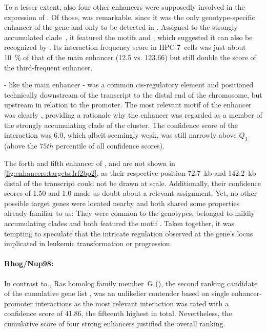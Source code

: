  To a lesser extent, also four other enhancers were supposedly involved in the expression of . Of those,  was remarkable, since it was the only genotype-specific enhancer of the gene and only to be detected in \dnmtwt{}. Assigned to the strongly accumulated clade~, it featured the motifs \motifmlltwo and \motifmlltwoc, which suggested it can also be recognized by . Its interaction frequency score in HPC-7~cells was just about \SI{10}{\percent} of that of the main enhancer (\num{12.5} vs. \num{123.66}) but still double the score of the third-frequent enhancer.    
 
  - like the main enhancer - was a common cis-regulatory element and positioned technically downstream of the transcript to the distal end of the chromosome, but upstream in relation to the promoter. The most relevant motif of the enhancer was clearly \motifpuone{}, providing a rationale why the enhancer was regarded as a member of the strongly accumulating clade  of the \amitone cluster. The confidence score of the interaction was \num{6.0}, which albeit seemingly weak, was still narrowly above $Q_3$ (above the $75th$ percentile of all confidence scores). 

The forth and fifth enhancer of ,  and  are not shown in \autoref{fig:enhancers:targets:Irf2bp2}, as their respective position \SI{72.7}{\kilo b}  and \SI{142.2}{\kilo b} distal of the transcript could not be drawn at scale. Additionally, their confidence scores of \num{1.50} and \num{1.0} made us doubt about a relevant assignment.  Yet, no other possible target genes were located nearby and both shared some properties already familiar to us:  They were common to the genotypes, belonged to mildly accumulating clades and both featured the motif \motifmlltwo{}. Taken together, it was tempting to speculate that the intricate regulation observed at the gene's locus implicated  in \mllafnine leukemic transformation or progression.

\paragraph{Rhog/Nup98:} In contrast to , Ras homolog family member~G (), the second ranking candidate of the cumulative gene list , was an unlikelier contender based on single enhancer-promoter interactions as the most relevant interaction was rated with a confidence score of \num{41.86}, the fifteenth highest in total. Nevertheless, the cumulative score of four strong enhancers justified the overall ranking.
 
